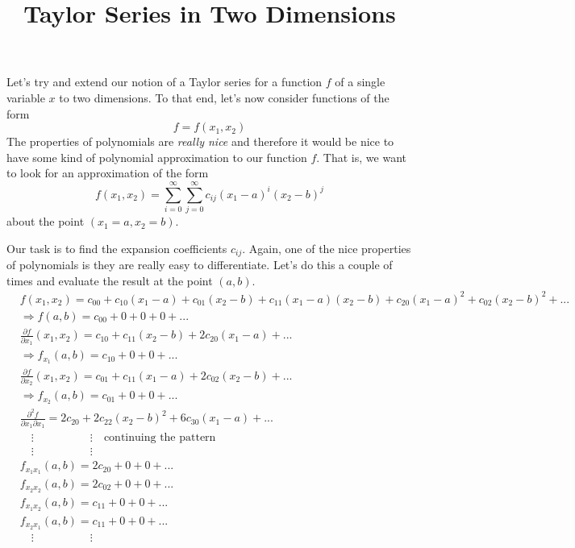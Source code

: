 \documentclass{article}
\title{Taylor Series in Two Dimensions}
\begin{document}
Let's try and extend our notion of a Taylor series for a function $f$ of a
single variable $x$ to two dimensions. To that end, let's now consider functions of
the form
\begin{equation}
  f = f(x_1, x_2) 
\end{equation}
The properties of polynomials are \textit{really nice} and therefore it would be
nice to have some kind of polynomial approximation to our function $f$. That is,
we want to look for an approximation of the form
\begin{equation}
  f(x_1, x_2) = \sum_{i=0}^{\infty}\sum_{j=0}^{\infty} c_{ij}(x_1-a)^i(x_2-b)^j
\end{equation}
about the point $(x_1 = a, x_2 = b)$.

Our task is to find the expansion coefficients $c_{ij}$. Again, one of the nice
properties of polynomials is they are really easy to differentiate. Let's do
this a couple of times and evaluate the result at the point $(a,b)$.
\begin{align}
  &f(x_1,x_2) = c_{00} + c_{10}(x_1-a) + c_{01}(x_2-b)+ c_{11}(x_1-a)(x_2-b) + c_{20}(x_1-a)^2+ c_{02}(x_2-b)^2 + ... \\
  &\Rightarrow f(a,b) = c_{00} + 0 + 0 + 0 + ... \\
  &\frac{\partial f}{\partial x_1}(x_1, x_2) = c_{10}  + c_{11}(x_2-b) + 2c_{20}(x_1-a) + ... \\
  &\Rightarrow f_{x_1}(a,b) = c_{10} + 0 + 0 + ... \\
  &\frac{\partial f}{\partial x_2}(x_1,x_2) = c_{01} + c_{11}(x_1-a) + 2c_{02}(x_2-b) + ... \\
  &\Rightarrow f_{x_2}(a,b) = c_{01} + 0 + 0  + ... \\
  &\frac{\partial^2 f}{\partial x_1 \partial x_1} = 2c_{20}+ 2c_{22}(x_2-b)^2 + 6c_{30}(x_1-a) + ... \\
  &\quad \vdots  \hspace{5em}\vdots \quad \textrm{continuing the pattern} \\
  &\quad \vdots  \hspace{5em}\vdots \\ 
  &f_{x_1x_1}(a,b) = 2c_{20} + 0 + 0 + ... \\
  &f_{x_2x_2}(a,b) = 2c_{02} + 0 + 0 + ... \\
  &f_{x_1x_2}(a,b) = c_{11} + 0 + 0 + ... \\
  &f_{x_2x_1}(a,b) = c_{11} + 0 + 0 + ...  \\ 
  &\quad \vdots  \hspace{5em}\vdots 
\end{align}
\end{document}
